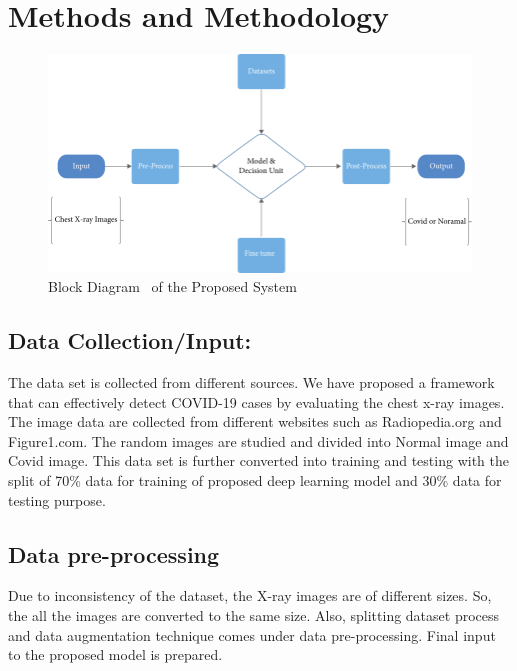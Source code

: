 \section{Methods and Methodology}

\begin{figure}[!h]
    \centering
        \includegraphics{assets/block.png}
    \caption{Block Diagram~\cite{Uddin2021} of the Proposed System}
\end{figure}

\subsection{Data Collection/Input:}

The data set is collected from different sources. We have proposed a framework that can effectively detect COVID-19 cases by evaluating the chest x-ray images. The image data are collected from different websites such as Radiopedia.org and Figure1.com. The random images are studied and divided into Normal image and Covid image. This data set is further converted into training and testing with the split of 70\% data for training of proposed deep learning model and 30\% data for testing purpose. 

\subsection{Data pre-processing }

Due to inconsistency of the dataset, the X-ray images are of different sizes. So, the all the images are converted to the same size. Also, splitting dataset process and data augmentation technique comes under data pre-processing. Final input to the proposed model is prepared. 
